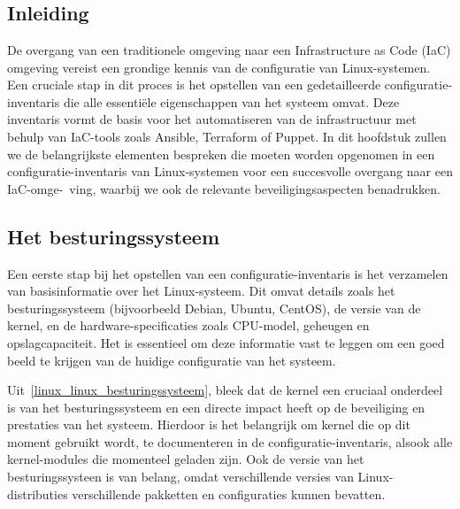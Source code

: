 
\chapter{}
\label{ch:risicoanalyse}

\section{Inleiding}
\label{risico_inleiding}

De overgang van een traditionele omgeving naar een Infrastructure as Code (IaC) omgeving vereist een grondige kennis van de configuratie van Linux-systemen.
Een cruciale stap in dit proces is het opstellen van een gedetailleerde configuratie-inventaris die alle essenti\"ele eigenschappen van het systeem omvat.
Deze inventaris vormt de basis voor het automatiseren van de infrastructuur met behulp van IaC-tools zoals Ansible, Terraform of Puppet.
In dit hoofdstuk zullen we de belangrijkste elementen bespreken die moeten worden opgenomen in een configuratie-inventaris van Linux-systemen voor een succesvolle overgang naar een IaC-omge-\ ving, waarbij we ook de relevante beveiligingsaspecten benadrukken.

\section{Het besturingssysteem}
\label{risico_besturingssysteem}

Een eerste stap bij het opstellen van een configuratie-inventaris is het verzamelen van basisinformatie over het Linux-systeem.
Dit omvat details zoals het besturingssysteem (bijvoorbeeld Debian, Ubuntu, CentOS), de versie van de kernel, en de hardware-specificaties zoals CPU-model, geheugen en opslagcapaciteit.
Het is essentieel om deze informatie vast te leggen om een goed beeld te krijgen van de huidige configuratie van het systeem.

Uit~\ref{linux_linux_besturingssysteem}, bleek dat de kernel een cruciaal onderdeel is van het besturingssysteem en een directe impact heeft op de beveiliging en prestaties van het systeem.
Hierdoor is het belangrijk om kernel die op dit moment gebruikt wordt, te documenteren in de configuratie-inventaris, alsook alle kernel-modules die momenteel geladen zijn.
Ook de versie van het besturingssysteen is van belang, omdat verschillende versies van Linux-distributies verschillende pakketten en configuraties kunnen bevatten.


